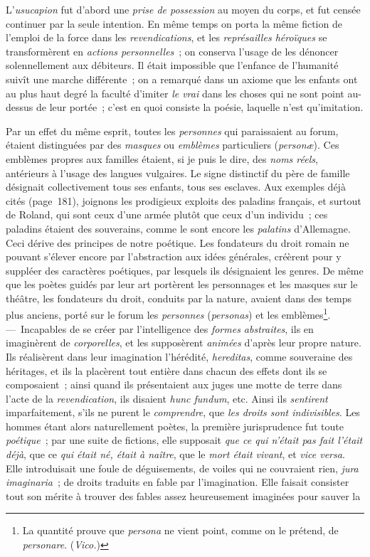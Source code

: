\documentclass[french,twoside]{book} %
\begin{document}
L’{\itshape usucapion} fut d’abord une {\itshape prise de possession} au moyen du corps, et fut censée continuer par la seule intention. En même temps on porta la même fiction de l’emploi de la force dans les {\itshape revendications}, et les {\itshape représailles héroïques} se transformèrent en {\itshape actions personnelles} ; on conserva l’usage de les dénoncer solennellement aux débiteurs. Il était impossible que l’enfance de l’humanité suivît une marche différente ; on a remarqué dans un axiome que les enfants ont au plus haut degré la faculté  d’imiter {\itshape le vrai} dans les choses qui ne sont point au-dessus de leur portée ; c’est en quoi consiste la poésie, laquelle n’est qu’imitation.\par
Par un effet du même esprit, toutes les {\itshape personnes} qui paraissaient au forum, étaient distinguées par des {\itshape masques} ou {\itshape emblèmes} particuliers ({\itshape personæ}). Ces emblèmes propres aux familles étaient, si je puis le dire, des {\itshape noms réels}, antérieurs à l’usage des langues vulgaires. Le signe distinctif du père de famille désignait collectivement tous ses enfants, tous ses esclaves. Aux exemples déjà cités (page 181), joignons les prodigieux exploits des paladins français, et surtout de Roland, qui sont ceux d’une armée plutôt que ceux d’un individu ; ces paladins étaient des souverains, comme le sont encore les {\itshape palatins} d’Allemagne. Ceci dérive des principes de notre poétique. Les fondateurs du droit romain ne pouvant s’élever encore par l’abstraction aux idées générales, créèrent pour y suppléer des caractères poétiques, par lesquels ils désignaient les genres. De même que les poètes guidés par leur art portèrent les personnages et les masques sur le théâtre, les fondateurs du droit, conduits par la nature, avaient dans des temps plus anciens, porté sur le forum les {\itshape personnes} ({\itshape personas}) et les emblèmes\footnote{La quantité prouve que {\itshape persona} ne vient point, comme on le prétend, de {\itshape personare}. ({\itshape Vico.})}. — Incapables de se créer par l’intelligence des {\itshape formes abstraites}, ils en imaginèrent de {\itshape corporelles}, et les supposèrent {\itshape animées} d’après leur propre nature. Ils  réalisèrent dans leur imagination l’hérédité, {\itshape hereditas}, comme souveraine des héritages, et ils la placèrent tout entière dans chacun des effets dont ils se composaient ; ainsi quand ils présentaient aux juges une motte de terre dans l’acte de la {\itshape revendication}, ils disaient {\itshape hunc fundum}, etc. Ainsi ils {\itshape sentirent} imparfaitement, s’ils ne purent le {\itshape comprendre}, que {\itshape les droits sont indivisibles}. Les hommes étant alors naturellement poètes, la première jurisprudence fut toute {\itshape poétique} ; par une suite de fictions, elle supposait {\itshape que ce qui n’était pas fait l’était déjà}, que ce {\itshape qui était né, était à naître}, que le {\itshape mort était vivant}, et {\itshape vice versa}. Elle introduisait une foule de déguisements, de voiles qui ne couvraient rien, {\itshape jura imaginaria} ; de droits traduits en fable par l’imagination. Elle faisait consister tout son mérite à trouver des fables assez heureusement imaginées pour sauver la 
\end{document}
